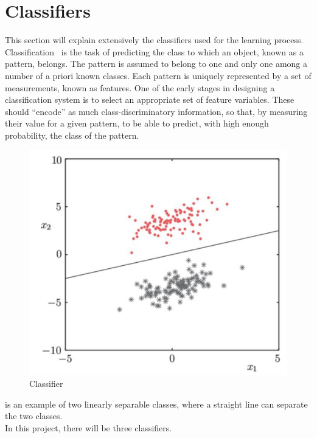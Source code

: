 \section{Classifiers}
\label{sec:clasif}
This section will explain extensively the classifiers used for the learning process.\\
Classification~\cite{classif} is the task of predicting the class to which an object, known as a pattern, belongs. The pattern is assumed to belong to one and only one among a number of a priori known classes. Each pattern is uniquely represented by a set of measurements, known as features. One of the early stages in designing a classification system is to select an appropriate set of feature variables. These should “encode” as much class-discriminatory information, so that, by measuring their value for a given pattern, to be able to predict, with high enough probability, the class of the pattern. 
\begin{figure}
	\centering
	\includegraphics[scale=0.5]{img/classifier.png}
	\caption{Classifier~\cite{classif}}
	\label{fig:classifier}
\end{figure}
 is an example of two linearly separable classes, where a straight line can separate the two classes. \\
In this project, there will be three classifiers.
